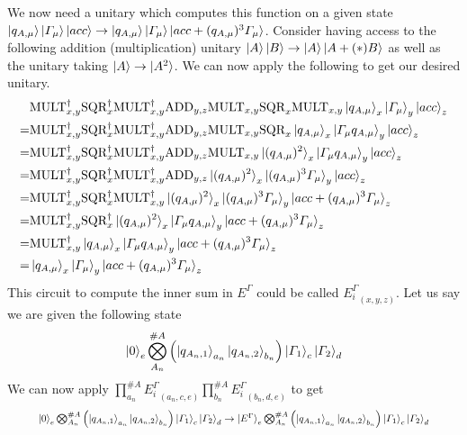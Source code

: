 \documentclass{article}
\begin{document}
We now need a unitary which computes this function on a given state $\ket{q_{A,\mu}}\ket{\varGamma_\mu}\ket{acc} \to \ket{q_{A,\mu}}\ket{\varGamma_\mu}\ket{acc+(q_{A,\mu})^3\varGamma_{\mu}}$. 
Consider having access to the following addition (multiplication) unitary $\ket{A}\ket{B} \to \ket{A}\ket{A+(*)B}$ as well as the unitary taking $\ket{A} \to \ket{A^2}$. 
We can now apply the following to get our desired unitary.  
\begin{align}
    &\text{MULT}^\dagger_{x,y}\text{SQR}^\dagger_x\text{MULT}^\dagger_{x,y}\text{ADD}_{y,z}\text{MULT}_{x,y}\text{SQR}_x\text{MULT}_{x,y}\ket{q_{A,\mu}}_x\ket{\varGamma_\mu}_y\ket{acc}_z\\ 
    = &\text{MULT}^\dagger_{x,y}\text{SQR}^\dagger_x\text{MULT}^\dagger_{x,y}\text{ADD}_{y,z}\text{MULT}_{x,y}\text{SQR}_x\ket{q_{A,\mu}}_x\ket{\varGamma_\mu q_{A,\mu}}_y\ket{acc}_z\\ 
    = &\text{MULT}^\dagger_{x,y}\text{SQR}^\dagger_x\text{MULT}^\dagger_{x,y}\text{ADD}_{y,z}\text{MULT}_{x,y}\ket{(q_{A,\mu})^2}_x\ket{\varGamma_\mu q_{A,\mu}}_y\ket{acc}_z\\ 
    = &\text{MULT}^\dagger_{x,y}\text{SQR}^\dagger_x\text{MULT}^\dagger_{x,y}\text{ADD}_{y,z}\ket{(q_{A,\mu})^2}_x\ket{(q_{A,\mu})^3\varGamma_\mu}_y\ket{acc}_z\\ 
    = &\text{MULT}^\dagger_{x,y}\text{SQR}^\dagger_x\text{MULT}^\dagger_{x,y}\ket{(q_{A,\mu})^2}_x\ket{(q_{A,\mu})^3\varGamma_\mu }_y\ket{acc+(q_{A,\mu})^3\varGamma_\mu}_z\\ 
    = &\text{MULT}^\dagger_{x,y}\text{SQR}^\dagger_x\ket{(q_{A,\mu})^2}_x\ket{\varGamma_\mu q_{A,\mu}}_y\ket{acc+(q_{A,\mu})^3\varGamma_\mu}_z\\ 
    = &\text{MULT}^\dagger_{x,y}\ket{q_{A,\mu}}_x\ket{\varGamma_\mu q_{A,\mu}}_y\ket{acc+(q_{A,\mu})^3\varGamma_\mu}_z\\ 
    = &\ket{q_{A,\mu}}_x\ket{\varGamma_\mu}_y\ket{acc+(q_{A,\mu})^3\varGamma_\mu }_z\\ 
\end{align}
This circuit to compute the inner sum in $E^\Gamma$ could be called ${E_i^\Gamma}_{(x,y,z)}$. Let us say we are given the following state 
\begin{equation}
\ket{0}_e\bigotimes_{A_n}^{\#A}\left(\ket{q_{A_n,1}}_{a_n}\ket{q_{A_n,2}}_{b_n}\right)\ket{\varGamma_1}_c\ket{\varGamma_2}_d 
\end{equation}
We can now apply $\prod_{a_n}^{\#A} {E_i^\Gamma}_{(a_n,c,e)}\prod_{b_n}^{\#A} {E_i^\Gamma}_{(b_n,d,e)}$ to get 
\begin{equation}
\resizebox{.9\hsize}{!}{$\ket{0}_e\bigotimes_{A_n}^{\#A}\left(\ket{q_{A_n,1}}_{a_n}\ket{q_{A_n,2}}_{b_n}\right)\ket{\varGamma_1}_c\ket{\varGamma_2}_d \to \ket{E^\Gamma}_e\bigotimes_{A_n}^{\#A}\left(\ket{q_{A_n,1}}_{a_n}\ket{q_{A_n,2}}_{b_n}\right)\ket{\varGamma_1}_c\ket{\varGamma_2}_d$}
\end{equation}
\end{document}

